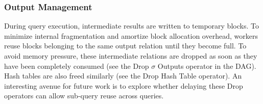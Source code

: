 

\subsubsection{Output Management}
During query execution, intermediate results are written to temporary blocks. To minimize internal fragmentation and amortize block allocation overhead, workers reuse blocks belonging to the same output relation until they become full. To avoid memory pressure, these intermediate relations are dropped as soon as they have been completely consumed (see the Drop $\sigma$ Outputs operator in the DAG). Hash tables are also freed similarly (see the Drop Hash Table operator). An interesting avenue for future work is to explore whether delaying these Drop operators can allow sub-query reuse across queries.
%
%


